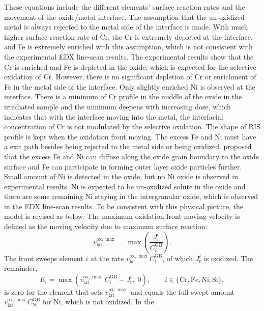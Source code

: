\documentclass[12pt]{article}
\newcommand{\GB}{\mathrm{GB}}
\newcommand{\lat}{\mathrm{lat}}
\newcommand{\ox}{\mathrm{ox}}
\begin{document}
These equations include the different elements' surface reaction rates and the movement of the oxide/metal interface. The assumption that the un-oxidized metal is always rejected to the metal side of the interface is made. With much higher surface reaction rate of Cr, the Cr is extremely depleted at the interface, and Fe is extremely enriched with this assumption, which is not consistent with the experimental EDX line-scan results\cite{deng2017effect}. The experimental results show that the Cr is enriched and Fe is depleted in the oxide, which is expected for the selective oxidation of Cr. However, there is no significant depletion of Cr or enrichment of Fe in the metal side of the interface. Only slightly enriched Ni is observed at the interface. There is a minimum of Cr profile in the middle of the oxide in the irradiated sample and the minimum deepens with increasing dose, which indicates that with the interface moving into the metal, the interfacial concentration of Cr is not modulated by the selective oxidation. The shape of RIS profile is kept when the oxidation front moving. The excess Fe and Ni must have a exit path besides being rejected to the metal side or being oxidized. \textcite{deng2020corrosion} proposed that the excess Fe and Ni can diffuse along the oxide grain boundary to the oxide surface and Fe can participate in forming outer layer oxide particles further. Small amount of Ni is detected in the oxide, but no Ni oxide is observed in experimental results\cite{deng2021grain}. Ni is expected to be un-oxidized solute in the oxide and there are some remaining Ni staying in the intergranular oxide, which is observed in the EDX line-scan results. To be consistent with this physical picture, the model is revised as below:
The maximum oxidation front moving velocity is defined as the moving velocity due to maximum surface reaction:
\begin{equation}
v_{\lat}^{\ox,\max}=\max{\left(\frac{J_{\mathrm{r}}^i}{C_i^{\GB}}\right)}.
\end{equation}
The front sweeps element $i$ at the rate $v_{\lat}^{\ox,\max}C_i^{\GB}$, of which
$J_{\mathrm{r}}^{i}$ is oxidized. The remainder,
\begin{equation}
E_i=\max\!\left(v_{\lat}^{\ox,\max}\,C_i^{\GB}-J_{\mathrm{r}}^{i},\;0\right),
\qquad i\in\{\mathrm{Cr},\mathrm{Fe},\mathrm{Ni},\mathrm{Si}\},
\label{eq:excess}
\end{equation}
is zero for the element that sets $v_{\lat}^{\ox,\max}$ and equals the full swept
amount $v_{\lat}^{\ox,\max}C_{\mathrm{Ni}}^{\GB}$ for Ni, which is not oxidized. In the
\end{document}

